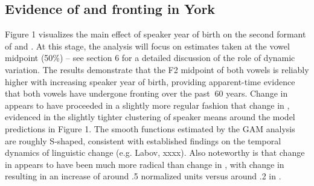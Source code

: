 \documentclass[12pt]{article}
\begin{document}
\subsection{Evidence of  and  fronting in York}
Figure 1 visualizes the main effect of speaker year of birth on the second formant of  and . At this stage, the analysis will focus on estimates taken at the vowel midpoint (50\%) -- see section 6 for a detailed discussion of the role of dynamic variation. The results demonstrate that the F2 midpoint of both vowels is reliably higher with increasing speaker year of birth, providing apparent-time evidence that both vowels have undergone fronting over the past $~$60 years. Change in  appears to have proceeded in a slightly more regular fashion that change in , evidenced in the slightly tighter clustering of speaker means around the model predictions in Figure 1. The smooth functions estimated by the GAM analysis are roughly S-shaped, consistent with established findings on the temporal dynamics of linguistic change (e.g. Labov, xxxx). Also noteworthy is that change in  appears to have been much more radical than change in , with change in  resulting in an increase of around .5 normalized units versus around .2 in . 
\end{document}
